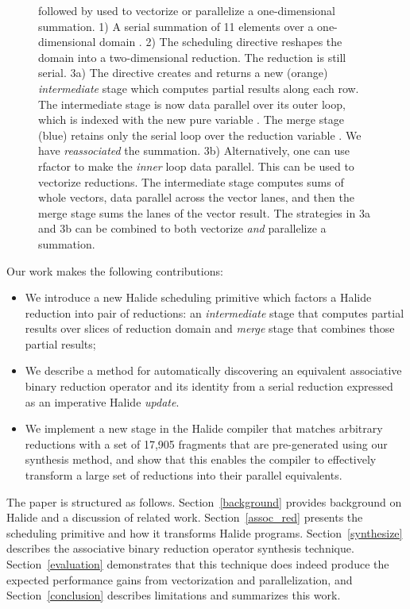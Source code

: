 \begin{figure}
{ followed by  used to vectorize or parallelize a one-dimensional summation. 1) A serial summation of 11 elements over a one-dimensional domain . 2) The  scheduling directive reshapes the domain into a two-dimensional reduction. The reduction is still serial. 3a) The  directive creates and returns a new (orange) \emph{intermediate} stage which computes partial results along each row. The intermediate stage is now data parallel over its outer loop, which is indexed with the new pure variable . The merge stage (blue) retains only the serial loop over the reduction variable . We have \emph{reassociated} the summation. 3b) Alternatively, one can use rfactor to make the \emph{inner} loop data parallel. This can be used to vectorize reductions. The intermediate stage computes sums of whole vectors, data parallel across the vector lanes, and then the merge stage sums the lanes of the vector result. The strategies in 3a and 3b can be combined to both vectorize \emph{and} parallelize a summation.
}
\label{fig:rfactor}
\end{figure}

Our work makes the following contributions:
\begin{itemize}
  \item We introduce a new Halide scheduling primitive  which factors a Halide reduction into pair of reductions: an \emph{intermediate} stage that computes partial results over slices of reduction domain and \emph{merge} stage that combines those partial results;
  \item We describe a method for automatically discovering an equivalent associative binary reduction operator and its identity from a serial reduction expressed as an imperative Halide \emph{update}.
  \item We implement a new stage in the Halide compiler that matches arbitrary reductions with a set of 17,905 fragments that are pre-generated using our synthesis method, and show that this enables the compiler to effectively transform a large set of reductions into their parallel equivalents.
\end{itemize}

The paper is structured as follows. Section~\ref{background} provides background on Halide and a discussion of related work. Section~\ref{assoc_red} presents the  scheduling primitive and how it transforms Halide programs. Section~\ref{synthesize} describes the associative binary reduction operator synthesis technique. Section~\ref{evaluation} demonstrates that this technique does indeed produce the expected performance gains from vectorization and parallelization, and Section~\ref{conclusion} describes limitations and summarizes this work.



